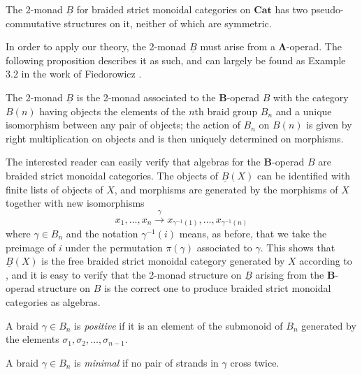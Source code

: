 \documentclass{amsbook} %
\newcommand{\mb}{\mathbf}
\newcommand{\ML}{\mathbf{\Lambda}}
\numberwithin{section}{chapter}
\begin{document}
\begin{thm}\label{braidpscomm}
The 2-monad $\underline{B}$ for braided strict monoidal categories on $\mb{Cat}$ has two pseudo-commutative structures on it, neither of which are symmetric.
\end{thm}

In order to apply our theory, the 2-monad $\underline{B}$ must arise from a $\ML$-operad.  The following proposition describes it as such, and can largely be found as Example 3.2 in the work of Fiedorowicz \cite{fie-br}.

\begin{prop}
The 2-monad $\underline{B}$ is the 2-monad associated to the $\mb{B}$-operad $B$ with the category $B(n)$ having objects the elements of the $n$th braid group $B_{n}$ and a unique isomorphism between any pair of objects; the action of $B_{n}$ on $B(n)$ is given by right multiplication on objects and is then uniquely determined on morphisms.
\end{prop}

The interested reader can easily verify that algebras for the $\mb{B}$-operad $B$ are braided strict monoidal categories.  The objects of $\underline{B}(X)$ can be identified with finite lists of objects of $X$, and morphisms are generated by the morphisms of $X$ together with new isomorphisms
  \[
    x_{1}, \ldots, x_{n} \stackrel{\gamma}{\longrightarrow} x_{\gamma^{-1}(1)}, \ldots, x_{\gamma^{-1}(n)}
  \]
where $\gamma \in B_{n}$ and the notation $\gamma^{-1}(i)$ means, as before, that we take the preimage of $i$ under the permutation $\pi(\gamma)$ associated to $\gamma$.  This shows that $\underline{B}(X)$ is the free braided strict monoidal category generated by $X$ according to \cite{js}, and it is easy to verify that the 2-monad structure on $\underline{B}$ arising from the $\mb{B}$-operad structure on $B$ is the correct one to produce braided strict monoidal categories as algebras.



\begin{Defi}
A braid $\gamma \in B_{n}$ is \textit{positive} if it is an element of the submonoid of $B_{n}$ generated by the elements $\sigma_{1}, \sigma_{2}, \ldots, \sigma_{n-1}$.
\end{Defi}

\begin{Defi}
 A braid $\gamma \in B_{n}$ is \textit{minimal} if no pair of strands in $\gamma$ cross twice.
\end{Defi}
\end{document}
